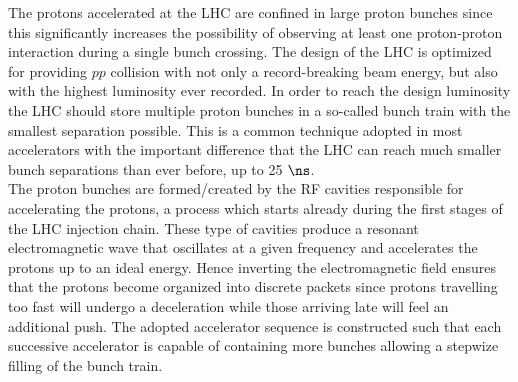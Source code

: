 The protons accelerated at the LHC are confined in large proton bunches since this significantly increases the possibility of observing at least one proton-proton interaction during a single bunch crossing. 
The design of the LHC is optimized for providing $pp$ collision with not only a record-breaking beam energy, but also with the highest luminosity ever recorded. In order to reach the design luminosity the LHC should store multiple proton bunches in a so-called bunch train with the smallest separation possible. 
This is a common technique adopted in most accelerators with the important difference that the LHC can reach much smaller bunch separations than ever before, up to 25 $\ns$.
\\
The proton bunches are formed/created by the RF cavities responsible for accelerating the protons, a process which starts already during the first stages of the LHC injection chain.
These type of cavities produce a resonant electromagnetic wave that oscillates at a given frequency and accelerates the protons up to an ideal energy.
Hence inverting the electromagnetic field ensures that the protons become organized into discrete packets since protons travelling too fast will undergo a deceleration while those arriving late will feel an additional push.
The adopted accelerator sequence is constructed such that each successive accelerator is capable of containing more bunches allowing a stepwize filling of the bunch train.

